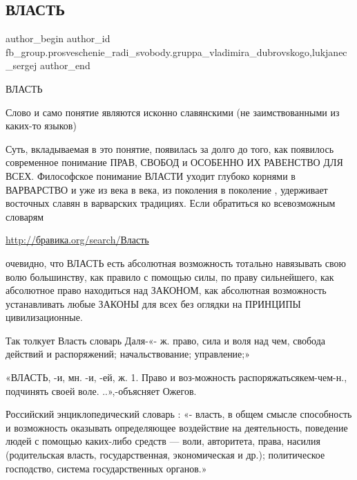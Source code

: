  
 
 
 
 
 
\subsection{ВЛАСТЬ}
\label{sec:12_01_2013.fb.fb_group.prosveschenie_radi_svobody.gruppa_vladimira_dubrovskogo.1.vlast}
 
\ifcmt
 author_begin
   author_id fb_group.prosveschenie_radi_svobody.gruppa_vladimira_dubrovskogo,lukjanec_sergej
 author_end
\fi

ВЛАСТЬ

Слово и само понятие являются исконно славянскими (не заимствованными из
каких-то языков)

Суть,  вкладываемая в это понятие, появилась за долго до того, как появилось
современное понимание ПРАВ, СВОБОД и ОСОБЕННО ИХ РАВЕНСТВО ДЛЯ ВСЕХ.
Философское понимание ВЛАСТИ уходит глубоко корнями в ВАРВАРСТВО и уже из века
в века, из поколения в поколение , удерживает восточных славян в варварских
традициях. Если обратиться ко всевозможным словарям

\url{http://бравика.org/search/Власть}

очевидно, что ВЛАСТЬ есть абсолютная возможность тотально навязывать свою волю
большинству, как правило с помощью силы, по праву сильнейшего, как абсолютное
право находиться над ЗАКОНОМ, как абсолютная возможность устанавливать любые
ЗАКОНЫ для всех без оглядки на ПРИНЦИПЫ цивилизационные.

Так толкует Власть словарь Даля-«- ж. право, сила и воля над чем, свобода
действий и распоряжений; начальствование; управление;»

«ВЛАСТЬ, -и, мн. -и, -ей, ж. 1. Право и воз-можность распоряжатьсякем-чем-н.,
подчинять своей воле. ..»,-объясняет Ожегов.

Российский энциклопедический словарь :  «- власть, в общем смысле способность и
возможность оказывать определяющее воздействие на деятельность, поведение людей
с помощью каких-либо средств — воли, авторитета, права, насилия (родительская
власть, государственная, экономическая и др.); политическое господство, система
государственных органов.»

